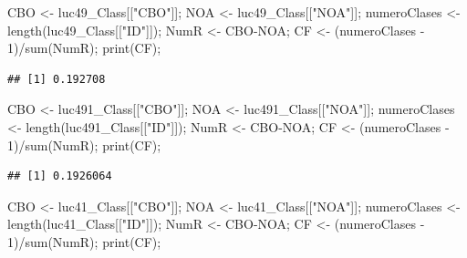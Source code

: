 \documentclass[
]{article}
\newenvironment{Shaded}{\begin{snugshade}}{\end{snugshade}}
\newcommand{\DecValTok}[1]{\textcolor[rgb]{0.00,0.00,0.81}{#1}}
\newcommand{\FunctionTok}[1]{\textcolor[rgb]{0.00,0.00,0.00}{#1}}
\newcommand{\NormalTok}[1]{#1}
\newcommand{\OtherTok}[1]{\textcolor[rgb]{0.56,0.35,0.01}{#1}}
\newcommand{\SpecialCharTok}[1]{\textcolor[rgb]{0.00,0.00,0.00}{#1}}
\newcommand{\StringTok}[1]{\textcolor[rgb]{0.31,0.60,0.02}{#1}}
\begin{document}
\begin{Shaded}
\begin{Highlighting}[]
\NormalTok{CBO }\OtherTok{\textless{}{-}}\NormalTok{ luc49\_Class[[}\StringTok{"CBO"}\NormalTok{]];}
\NormalTok{NOA }\OtherTok{\textless{}{-}}\NormalTok{ luc49\_Class[[}\StringTok{"NOA"}\NormalTok{]];}
\NormalTok{numeroClases }\OtherTok{\textless{}{-}} \FunctionTok{length}\NormalTok{(luc49\_Class[[}\StringTok{"ID"}\NormalTok{]]);}
\NormalTok{NumR }\OtherTok{\textless{}{-}}\NormalTok{ CBO}\SpecialCharTok{{-}}\NormalTok{NOA;}
\NormalTok{CF }\OtherTok{\textless{}{-}}\NormalTok{ (numeroClases }\SpecialCharTok{{-}} \DecValTok{1}\NormalTok{)}\SpecialCharTok{/}\FunctionTok{sum}\NormalTok{(NumR);}
\FunctionTok{print}\NormalTok{(CF);}
\end{Highlighting}
\end{Shaded}

\begin{verbatim}
## [1] 0.192708
\end{verbatim}

\begin{Shaded}
\begin{Highlighting}[]
\NormalTok{CBO }\OtherTok{\textless{}{-}}\NormalTok{ luc491\_Class[[}\StringTok{"CBO"}\NormalTok{]];}
\NormalTok{NOA }\OtherTok{\textless{}{-}}\NormalTok{ luc491\_Class[[}\StringTok{"NOA"}\NormalTok{]];}
\NormalTok{numeroClases }\OtherTok{\textless{}{-}} \FunctionTok{length}\NormalTok{(luc491\_Class[[}\StringTok{"ID"}\NormalTok{]]);}
\NormalTok{NumR }\OtherTok{\textless{}{-}}\NormalTok{ CBO}\SpecialCharTok{{-}}\NormalTok{NOA;}
\NormalTok{CF }\OtherTok{\textless{}{-}}\NormalTok{ (numeroClases }\SpecialCharTok{{-}} \DecValTok{1}\NormalTok{)}\SpecialCharTok{/}\FunctionTok{sum}\NormalTok{(NumR);}
\FunctionTok{print}\NormalTok{(CF);}
\end{Highlighting}
\end{Shaded}

\begin{verbatim}
## [1] 0.1926064
\end{verbatim}

\begin{Shaded}
\begin{Highlighting}[]
\NormalTok{CBO }\OtherTok{\textless{}{-}}\NormalTok{ luc41\_Class[[}\StringTok{"CBO"}\NormalTok{]];}
\NormalTok{NOA }\OtherTok{\textless{}{-}}\NormalTok{ luc41\_Class[[}\StringTok{"NOA"}\NormalTok{]];}
\NormalTok{numeroClases }\OtherTok{\textless{}{-}} \FunctionTok{length}\NormalTok{(luc41\_Class[[}\StringTok{"ID"}\NormalTok{]]);}
\NormalTok{NumR }\OtherTok{\textless{}{-}}\NormalTok{ CBO}\SpecialCharTok{{-}}\NormalTok{NOA;}
\NormalTok{CF }\OtherTok{\textless{}{-}}\NormalTok{ (numeroClases }\SpecialCharTok{{-}} \DecValTok{1}\NormalTok{)}\SpecialCharTok{/}\FunctionTok{sum}\NormalTok{(NumR);}
\FunctionTok{print}\NormalTok{(CF);}
\end{Highlighting}
\end{Shaded}
\end{document}
